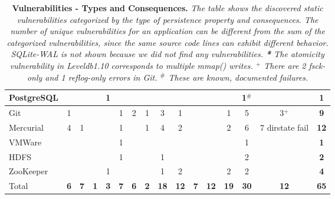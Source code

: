 \begin{table}[t]
{\begin{tabular}{>{\scriptsize}l!{\vrule width 1pt}c|cccc|ccc|cc!{\vrule width 1pt}c|c|c|>{\scriptsize}c@{}!{\vrule width 1pt}>{\bfseries}c}
PostgreSQL &  &  &  & 1 &  &  &  &  &  &  &  &  & 1{\scriptsize $^{\#}$} &  & 1 \\ \hline
Git  & 1 &   &   &   & 1 & 2 & 1 & 3 & 1 &   &   & 1 & 5 & 3$^{+}$ & 9 \\ \hline
Mercurial & 4 & 1 &   &   & 1 &  & 1 & 4 & 2 &   &   & 2 & 6 & 7 dirstate fail & 12 \\ \hline
VMWare &   &   &   &   & 1 &  &  &  &   &   &   &  & 1 &  & 1 \\ \hline
HDFS &  &  &  &  & 1 &  &  & 1 &  &  &  &  & 2 &  & 2 \\ \hline
ZooKeeper &  &  &  & 1 &  &  &  & 1 & 2 &  &  & 2 & 2 &  & 4 \\ \hline
Total & \textbf{6} & \textbf{7} & \textbf{1} & \textbf{3} & \textbf{7} & \textbf{6} & \textbf{2} & \textbf{18} & \textbf{12} & \textbf{7} & \textbf{12} & \textbf{19} & \textbf{30} & \textbf{12} & \textbf{65}\\
\end{tabular}
}
\caption{\textbf{Vulnerabilities - Types and Consequences.} \textit{
{\footnotesize
The table shows the discovered static vulnerabilities categorized by the type of persistence property and consequences. The number of unique vulnerabilities for an application can be different from the sum of the categorized vulnerabilities, since the same source code lines can exhibit different behavior. SQLite-WAL is not shown because we did not find any vulnerabilities. \textbf{*} The atomicity vulnerability in Leveldb1.10 corresponds to multiple mmap() writes. \textbf{$^{+}$} There are 2 fsck-only and 1 reflog-only errors in Git. \textbf{{\scriptsize $^{\#}$}} These are known, documented failures.
}
}}
\label{tbl-vuls}
\end{table}
\setlength{\tabcolsep}{\tempa}

